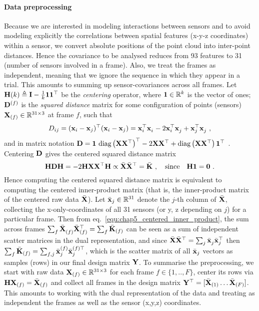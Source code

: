         \paragraph{Data preprocessing}
        Because we are interested in modeling interactions between sensors and to avoid modeling explicitly the correlations between spatial features (x-y-z coordinates) within a sensor, we convert absolute positions of the point cloud into inter-point distances. Hence the covariance to be analysed reduces from 93 features to 31 (number of sensors involved in a frame). Also, we treat the frames as independent, meaning that we ignore the sequence in which they appear in a trial. This amounts to summing up sensor-covariances across all frames.
        Let $\mathbf{H}(k) \triangleq \mathbf{I} - \tfrac{1}{k}\mathbf{1}\mathbf{1}^\top$ be the \emph{centering} operator, where $\mathbf{1} \in \mathbb{R}^{k}$ is the vector of ones; $\mathbf{D}^{(f)}$ is the \emph{squared distance} matrix for some configuration of points (sensors) $\mathbf{X}_{(f)} \in \mathbb{R}^{31 \times 3}$ at frame $f$, such that
        \[
          D_{ij} = (\mathbf{x}_i - \mathbf{x}_j)^\top (\mathbf{x}_i - \mathbf{x}_j) = \mathbf{x}_i^\top \mathbf{x}_i^{~} - 2 \mathbf{x}_i^\top \mathbf{x}_j^{~} + \mathbf{x}_j^\top \mathbf{x}_j^{~} ~,
        \]
        and in matrix notation $\mathbf{D} = \mathbf{1} ~\textrm{diag}\left( \mathbf{X}\mathbf{X}^\top \right)^\top - 2 \mathbf{X} \mathbf{X}^\top + \textrm{diag}\left( \mathbf{X} \mathbf{X}^\top \right) \mathbf{1}^\top ~$. Centering $\mathbf{D}$ gives the centered squared distance matrix
        \begin{equation} \label{equ:chap5_centered_inner_product}
          \mathbf{H} \mathbf{D} \mathbf{H} = - 2 \mathbf{H} \mathbf{X} \mathbf{X}^\top \mathbf{H} \propto \bar{\mathbf{X}} \bar{\mathbf{X}}^\top = \bar{\mathbf{K}}~, \quad \textrm{since} \quad \mathbf{H} \mathbf{1} = \mathbf{0} ~.
        \end{equation}
        Hence computing the centered squared distance matrix is equivalent to computing the centered inner-product matrix (that is, the inner-product matrix of the centered raw data $\bar{\mathbf{X}}$). Let $\bar{\mathbf{x}}_j \in \mathbb{R}^{31}$ denote the $j$-th column of $\bar{\mathbf{X}}$, collecting the x-only-coordinates of all 31 sensors (or y, z depending on $j$) for a particular frame. Then from eq.~\eqref{equ:chap5_centered_inner_product}, the sum across frames $\sum_f^{~} \bar{\mathbf{X}}_{(f)}^{~} \bar{\mathbf{X}}_{(f)}^\top = \sum_f \bar{\mathbf{K}}_{(f)}$ can be seen as a sum of independent scatter matrices in the dual representation, and since $\bar{\mathbf{X}} \bar{\mathbf{X}}^\top= \sum_j \bar{\mathbf{x}}_j^{~}  \bar{\mathbf{x}}_j^\top$ then $\sum_f \bar{\mathbf{K}}_{(f)} = \sum_{f,j}^{~} \bar{\mathbf{x}}_j^{(f)} \bar{\mathbf{x}}_j^{(f)\top}$, which is the scatter matrix of all $\bar{\mathbf{x}}_j$ vectors as samples (rows) in our final design matrix $\mathbf{Y}$.      
        To summarise the preprocessing, we start with raw data $\mathbf{X}_{(f)} \in \mathbb{R}^{31 \times 3}$ for each frame $f \in \{1,..,F\}$, center its rows via $\mathbf{H} \mathbf{X}_{(f)} = \bar{\mathbf{X}}_{(f)}$ and collect all frames in the design matrix $\mathbf{Y}^\top = [ \bar{\mathbf{X}}_{(1)} \dots \bar{\mathbf{X}}_{(F)} ]$. This amounts to working with the dual representation of the data and treating as independent the frames as well as the sensor (x,y,z) coordinates.
      
